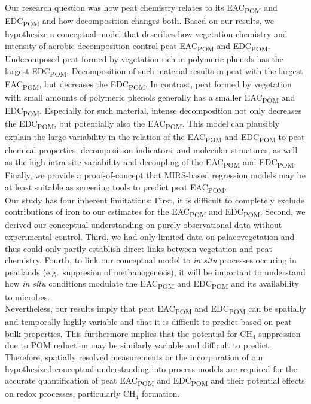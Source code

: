 \documentclass[draft,linenumbers]{agujournal2018}
\begin{document}
Our research question was how peat chemistry relates to its
EAC\textsubscript{POM} and EDC\textsubscript{POM} and how decomposition
changes both. Based on our results, we hypothesize a conceptual model
that describes how vegetation chemistry and intensity of aerobic
decomposition control peat EAC\textsubscript{POM} and
EDC\textsubscript{POM}. Undecomposed peat formed by vegetation rich in
polymeric phenols has the largest EDC\textsubscript{POM}. Decomposition
of such material results in peat with the largest
EAC\textsubscript{POM}, but decreases the EDC\textsubscript{POM}. In
contrast, peat formed by vegetation with small amounts of polymeric
phenols generally has a smaller EAC\textsubscript{POM} and
EDC\textsubscript{POM}. Especially for such material, intense
decomposition not only decreases the EDC\textsubscript{POM}, but
potentially also the EAC\textsubscript{POM}. This model can plausibly
explain the large variability in the relation of the
EAC\textsubscript{POM} and EDC\textsubscript{POM} to peat chemical
properties, decomposition indicators, and molecular structures, as well
as the high intra-site variability and decoupling of the
EAC\textsubscript{POM} and EDC\textsubscript{POM}. Finally, we provide a
proof-of-concept that MIRS-based regression models may be at least
suitable as screening tools to predict peat EAC\textsubscript{POM}.\\
Our study has four inherent limitations: First, it is difficult to
completely exclude contributions of iron to our estimates for the
EAC\textsubscript{POM} and EDC\textsubscript{POM}. Second, we derived
our conceptual understanding on purely observational data without
experimental control. Third, we had only limited data on
palaeovegetation and thus could only partly establish direct links
between vegetation and peat chemistry. Fourth, to link our conceptual
model to \emph{in situ} processes occuring in peatlands (e.g.~suppresion
of methanogenesis), it will be important to understand how \emph{in
situ} conditions modulate the EAC\textsubscript{POM} and
EDC\textsubscript{POM} and its availability to microbes.\\
Nevertheless, our results imply that peat EAC\textsubscript{POM} and
EDC\textsubscript{POM} can be spatially and temporally highly variable
and that it is difficult to predict based on peat bulk properties. This
furthermore implies that the potential for CH\(_4\) suppression due to
POM reduction may be similarly variable and difficult to predict.\\
Therefore, spatially resolved measurements or the incorporation of our
hypothesized conceptual understanding into process models are required
for the accurate quantification of peat EAC\textsubscript{POM} and
EDC\textsubscript{POM} and their potential effects on redox processes,
particularly CH\(_4\) formation.
\end{document}
